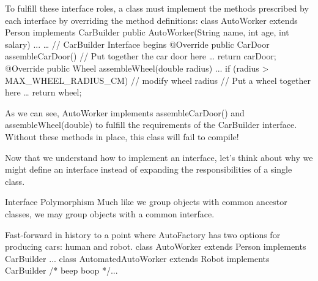         To fulfill these interface roles, a class must implement the methods prescribed by each interface by overriding the method definitions:
            class AutoWorker extends Person implements CarBuilder {
                public AutoWorker(String name, int age, int salary) {
                    ...
                }
                …
                // CarBuilder Interface begins
                @Override
                public CarDoor assembleCarDoor() {
                    // Put together the car door here
                    …
                    return carDoor;
                }
                @Override
                public Wheel assembleWheel(double radius) {
                    ...
                    if (radius > MAX_WHEEL_RADIUS_CM) {
                        // modify wheel radius
                    }
                    // Put a wheel together here
                    …
                    return wheel;
                }
            }

        As we can see, AutoWorker implements assembleCarDoor() and assembleWheel(double) to fulfill the requirements of the CarBuilder interface. Without these methods in place, this class will fail to compile!

        Now that we understand how to implement an interface, let’s think about why we might define an interface instead of expanding the responsibilities of a single class.

    Interface Polymorphism
        Much like we group objects with common ancestor classes, we may group objects with a common interface.

        Fast-forward in history to a point where AutoFactory has two options for producing cars: human and robot.
            class AutoWorker extends Person implements CarBuilder {...}
            class AutomatedAutoWorker extends Robot implements CarBuilder {/* beep boop */...}

